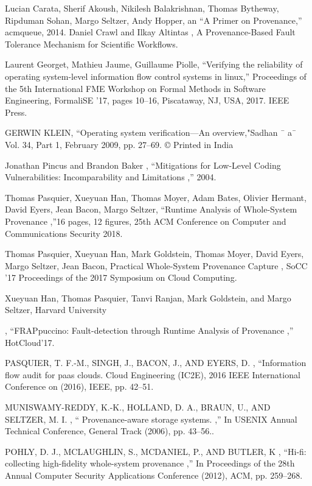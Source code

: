 \documentclass{IEEEtran}
\begin{document}
\begin{thebibliography}{00}
 Lucian Carata, Sherif Akoush, Nikilesh Balakrishnan, Thomas Bytheway,
Ripduman Sohan, Margo Seltzer, Andy Hopper, an ``A Primer on Provenance,'' acmqueue, 2014.
 Daniel Crawl and Ilkay Altintas , A Provenance-Based Fault Tolerance Mechanism for
Scientific Workflows.

 Laurent Georget, Mathieu Jaume, Guillaume Piolle, ``Verifying the reliability of operating system-level information flow control systems in linux,'' Proceedings of the 5th International FME Workshop on Formal Methods in Software Engineering, FormaliSE ’17, pages 10–16, Piscataway, NJ, USA, 2017. IEEE Press.

GERWIN KLEIN, ``Operating system verification—An overview,"Sadhan ¯ a¯ Vol. 34, Part 1, February 2009, pp. 27–69. © Printed in India

 Jonathan Pincus and Brandon Baker , ``Mitigations for Low-Level Coding Vulnerabilities:
Incomparability and Limitations ,'' 2004.


Thomas Pasquier, Xueyuan Han, Thomas Moyer, Adam Bates, Olivier Hermant, David Eyers, Jean Bacon, Margo Seltzer, ``Runtime Analysis of Whole-System Provenance
,''16 pages, 12 figures, 25th ACM Conference on Computer and Communications Security 2018.



 Thomas Pasquier, Xueyuan Han, Mark Goldstein, Thomas Moyer, David Eyers, Margo Seltzer, Jean Bacon, Practical Whole-System Provenance Capture
, SoCC '17 Proceedings of the 2017 Symposium on Cloud Computing.


 Xueyuan Han, Thomas Pasquier, Tanvi Ranjan, Mark Goldstein, and Margo Seltzer, Harvard University

 , ``FRAPpuccino: Fault-detection through Runtime Analysis of Provenance ,'' HotCloud'17.



 PASQUIER, T. F.-M., SINGH, J., BACON, J., AND EYERS, D. , ``Information flow audit for paas clouds.
Cloud Engineering
(IC2E), 2016 IEEE International Conference on (2016), IEEE,
pp. 42–51.


 MUNISWAMY-REDDY, K.-K., HOLLAND, D. A., BRAUN, U.,
AND SELTZER, M. I. , `` Provenance-aware storage systems. ,'' In
USENIX Annual Technical Conference, General Track (2006),
pp. 43–56..


 POHLY, D. J., MCLAUGHLIN, S., MCDANIEL, P., AND BUTLER, K , ``Hi-fi: collecting high-fidelity whole-system provenance ,'' In Proceedings of the 28th Annual Computer Security Applications Conference (2012), ACM, pp. 259–268.



\end{thebibliography}
\end{document}

